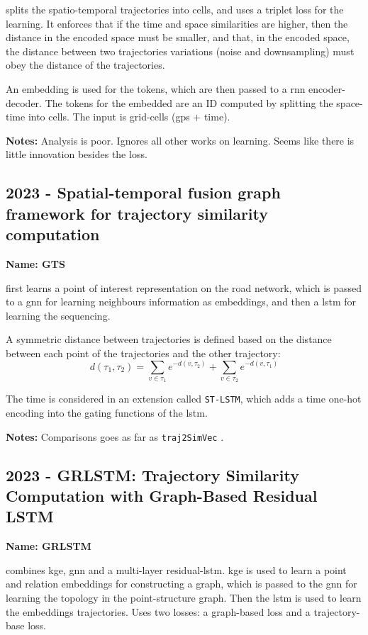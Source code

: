 \cite{chen2022towards} splits the spatio-temporal trajectories into cells, and uses a triplet loss for the learning.
%
It enforces that if the time and space similarities are higher, then the distance in the encoded space must be smaller, and that, in the encoded space, the distance between two trajectories variations (noise and downsampling) must obey the distance of the trajectories.

An embedding is used for the tokens, which are then passed to a \gls{rnn} encoder-decoder. The tokens for the embedded are an ID computed by splitting the space-time into cells. The input is grid-cells (gps + time).

\textbf{Notes:} Analysis is poor. Ignores all other works on learning. Seems like there is little innovation besides the loss.


\subsection*{2023 - Spatial-temporal fusion graph framework for trajectory similarity computation}

\textbf{Name: GTS}

\cite{zhou2023spatial} first learns a point of interest representation on the road network, which is passed to a \gls{gnn} for learning neighbours information as embeddings, and then a \gls{lstm} for learning the sequencing.



A symmetric distance  between trajectories is defined based on the distance between each point of the trajectories and the other trajectory:
$$
d(\tau_1, \tau_2) = \sum_{v\in\tau_1}e^{-d(v, \tau_2)} + \sum_{v\in\tau_2}e^{-d(v, \tau_1)}
$$

The time is considered in an extension called \texttt{ST-LSTM}, which adds a time one-hot encoding into the gating functions of the \gls{lstm}.

\textbf{Notes:} Comparisons goes as far as \texttt{traj2SimVec} \cite{zhang2020trajectory}.

\subsection*{2023 - GRLSTM: Trajectory Similarity Computation with Graph-Based Residual LSTM}

\textbf{Name: GRLSTM}

\cite{zhou2023grlstm} combines \gls{kge}, \gls{gnn} and a multi-layer residual-\gls{lstm}.
%
\gls{kge} is used to learn a point and relation embeddings for constructing a graph, which is passed to the \gls{gnn} for learning the topology in the point-structure graph. Then the \gls{lstm} is used to learn the embeddings trajectories.
%
Uses two losses: a graph-based loss and a trajectory-base loss.

